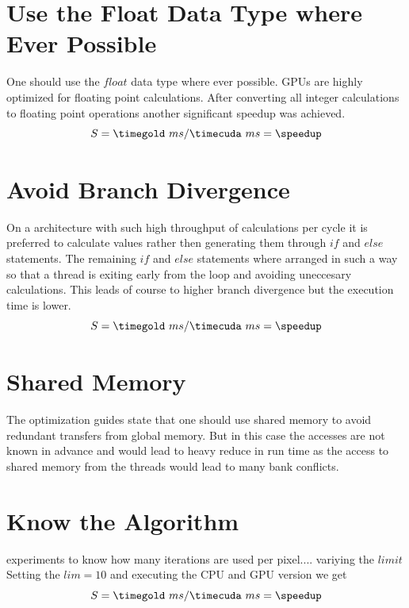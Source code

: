 
\section{Use the Float Data Type where Ever Possible}
One should use the $float$ data type where ever possible. \glspl{GPU} are 
highly optimized for floating point calculations. After converting all integer
calculations to floating point operations another significant speedup was 
achieved.
\fpDiv{\speedup}{\timegold}{\timecuda}
\begin{equation*}\label{eq:speedup0}
	S = \timegold\ ms/\timecuda\ ms = \speedup
\end{equation*}


\section{Avoid Branch Divergence} %
\label{sec:avoid_branch_divergence}
On a architecture with such high throughput of calculations per cycle it is preferred
to calculate values rather then generating them through $if$ and $else$ statements.
The remaining $if$ and $else$ statements where arranged in such a way so that a 
thread is exiting early from the loop and avoiding uneccesary calculations. This leads
of course to higher branch divergence but the execution time is lower. 
\fpDiv{\speedup}{\timegold}{\timecuda}
\begin{equation*}\label{eq:speedup0}
	S = \timegold\ ms/\timecuda\ ms = \speedup
\end{equation*}

\section{Shared Memory} %
\label{sec:shared_memory}
The optimization guides state that one should use shared memory to avoid 
redundant transfers from global memory. But in this case the accesses are not 
known in advance and would lead to heavy reduce in run time as the access to 
shared memory from the threads would lead to many bank conflicts. 

\section{Know the Algorithm} %
\label{sec:know_the_algo}

experiments to know how many iterations are used per pixel.... 
variying the $limit$
Setting the $lim = 10$ and executing the \gls{CPU} and \gls{GPU} version we get
\fpDiv{\speedup}{\tgold}{\tcuda}
\begin{equation*}\label{eq:speedup0}
	S = \timegold\ ms/\timecuda\ ms = \speedup
\end{equation*}


